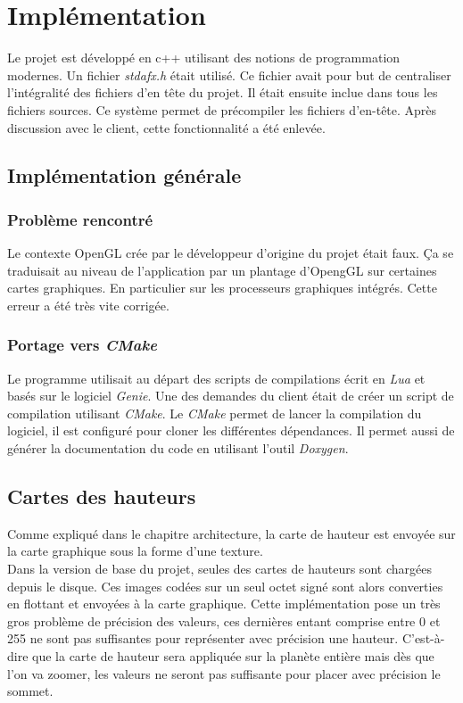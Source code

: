 \chapter{Implémentation}
    Le projet est développé en c++ utilisant des notions de programmation modernes.
    Un fichier \textit{stdafx.h} était utilisé. Ce fichier avait pour but de centraliser l'intégralité des fichiers d'en tête du projet. Il était ensuite inclue dans tous les fichiers sources. Ce système permet de précompiler les fichiers d'en-tête. Après discussion avec le client, cette fonctionnalité a été enlevée.

    \section{Implémentation générale}
    \subsection{Problème rencontré}
    Le contexte OpenGL crée par le développeur d'origine du projet était faux. Ça se traduisait au niveau
    de l'application par un plantage d'OpengGL sur certaines cartes graphiques. En particulier sur les processeurs graphiques intégrés. Cette erreur a été très vite corrigée.
   
    \subsection{Portage vers \textit{CMake}}
    Le programme utilisait au départ des scripts de compilations écrit en \textit{Lua} et basés sur le logiciel \textit{Genie}.
    Une des demandes du client était de créer un script de compilation utilisant \textit{CMake}.
    Le \textit{CMake} permet de lancer la compilation du logiciel, il est configuré pour cloner les différentes dépendances. 
    Il permet aussi de générer la documentation du code en utilisant l'outil \textit{Doxygen}.\\
    
    \section{Cartes des hauteurs}
    Comme expliqué dans le chapitre architecture, la carte de hauteur est envoyée sur la carte graphique sous la forme
    d'une texture.\\
    Dans la version de base du projet, seules des cartes de hauteurs sont chargées depuis le disque. Ces images codées sur un
    seul octet signé sont alors converties en flottant et envoyées à la carte graphique. Cette implémentation pose un très gros problème de précision des valeurs, ces dernières entant comprise entre 0 et 255 ne sont pas suffisantes pour représenter
    avec précision une hauteur. C'est-à-dire que la carte de hauteur sera appliquée sur la planète entière mais dès que l'on va zoomer, les valeurs ne seront pas suffisante pour placer avec précision le sommet.
    
